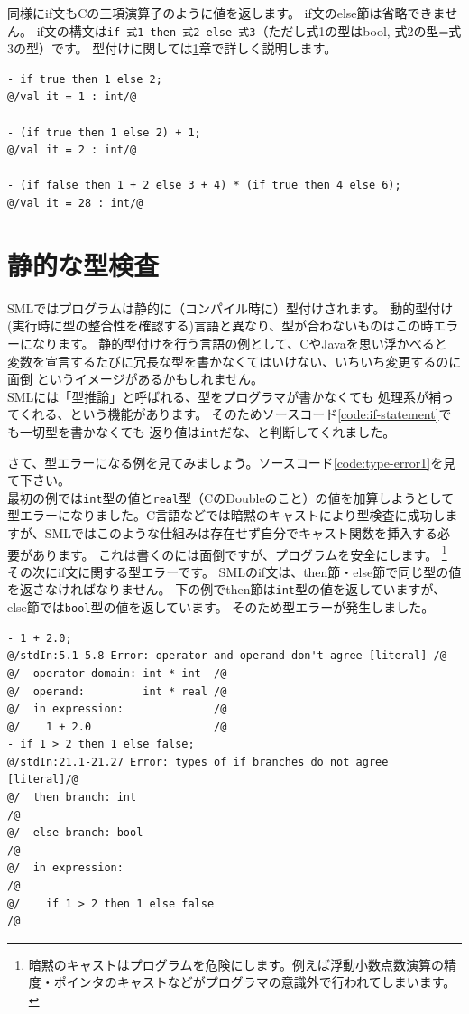 \documentclass[11pt,a4paper]{article}
\begin{document}
同様にif文もCの三項演算子のように値を返します。
if文のelse節は省略できません。
if文の構文は\lstinline{if 式1 then 式2 else 式3}（ただし式1の型はbool, 式2の型=式3の型）です。
型付けに関しては\ref{sec:static-typing}章で詳しく説明します。

\begin{lstlisting}[caption=if文は式,label=code:if-statement]
- if true then 1 else 2;
@/val it = 1 : int/@

- (if true then 1 else 2) + 1;
@/val it = 2 : int/@

- (if false then 1 + 2 else 3 + 4) * (if true then 4 else 6);
@/val it = 28 : int/@
\end{lstlisting}

\section{静的な型検査}
\label{sec:static-typing}

SMLではプログラムは静的に（コンパイル時に）型付けされます。
動的型付け(実行時に型の整合性を確認する)言語と異なり、型が合わないものはこの時エラーになります。
静的型付けを行う言語の例として、CやJavaを思い浮かべると
変数を宣言するたびに冗長な型を書かなくてはいけない、いちいち変更するのに面倒
というイメージがあるかもしれません。\\
SMLには「型推論」と呼ばれる、型をプログラマが書かなくても
処理系が補ってくれる、という機能があります。
そのためソースコード\ref{code:if-statement}でも一切型を書かなくても
返り値は\lstinline{int}だな、と判断してくれました。

さて、型エラーになる例を見てみましょう。ソースコード\ref{code:type-error1}を見て下さい。\\
最初の例では\lstinline{int}型の値と\lstinline{real}型（CのDoubleのこと）の値を加算しようとして型エラーになりました。C言語などでは暗黙のキャストにより型検査に成功しますが、SMLではこのような仕組みは存在せず自分でキャスト関数を挿入する必要があります。
これは書くのには面倒ですが、プログラムを安全にします。
\footnote{暗黙のキャストはプログラムを危険にします。例えば浮動小数点数演算の精度・ポインタのキャストなどがプログラマの意識外で行われてしまいます。}\\
その次にif文に関する型エラーです。
SMLのif文は、then節・else節で同じ型の値を返さなければなりません。
下の例でthen節は\lstinline{int}型の値を返していますが、else節では\lstinline{bool}型の値を返しています。
そのため型エラーが発生しました。

\begin{lstlisting}[label=code:type-error1,caption=型エラー１]
- 1 + 2.0;
@/stdIn:5.1-5.8 Error: operator and operand don't agree [literal] /@
@/  operator domain: int * int  /@
@/  operand:         int * real /@
@/  in expression:              /@
@/    1 + 2.0                   /@
- if 1 > 2 then 1 else false;
@/stdIn:21.1-21.27 Error: types of if branches do not agree [literal]/@
@/  then branch: int                                                 /@
@/  else branch: bool                                                /@
@/  in expression:                                                   /@
@/    if 1 > 2 then 1 else false                                     /@
\end{lstlisting}
\end{document}
